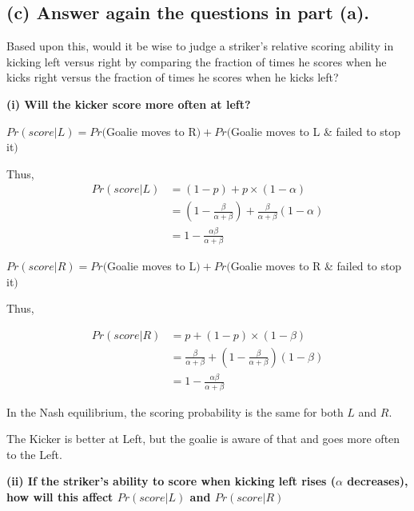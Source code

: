 \documentclass{article}
\begin{document}
   
\subsection*{(c) Answer again the questions in part (a).}

 Based upon this, would it be wise to judge a striker's relative scoring ability in kicking left versus right by comparing the fraction of times he scores when he kicks right versus the fraction of times he scores when he kicks left?

\medskip

\textbf{(i) Will the kicker score more often at left?}

\medskip

$Pr(score|L) = Pr($Goalie moves to R$) + Pr($Goalie moves to L \&  failed to stop it$)$

\medskip

Thus, 
\begin{align*}
Pr(score|L) &= (1-p) + p \times (1-\alpha) \\
&= (1-\tfrac{\beta}{\alpha + \beta}) + \tfrac{\beta}{\alpha + \beta} (1-\alpha) \\
&= 1- \tfrac{\alpha \beta }{\alpha + \beta} 
\end{align*}


$Pr(score|R) = Pr($Goalie moves to L$) + Pr($Goalie moves to R \&  failed to stop it$)$

\medskip

Thus, 

\begin{align*}
Pr(score|R) &= p + (1-p)\times (1-\beta)  \\
&= \tfrac{\beta}{\alpha + \beta} + (1-\tfrac{\beta}{\alpha + \beta}) (1-\beta) \\
&=  1- \tfrac{\alpha \beta }{\alpha + \beta}
\end{align*}

In the Nash equilibrium, the scoring probability is the same for both $L$ and $R$.


\begin{mdframed}[backgroundcolor=blue!20,linecolor=white]
The Kicker is better at Left, but the goalie is aware of that and goes more often to the Left.

\end{mdframed}


\textbf{(ii) If the striker's ability to score when kicking left rises ($\alpha$ decreases), how will this affect $Pr(score|L)$ and $Pr(score|R)$}

\medskip
\end{document}
